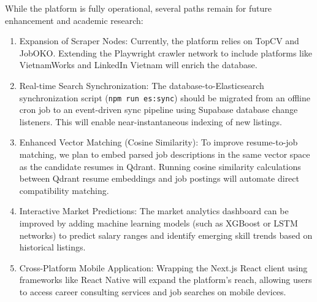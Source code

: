 \documentclass[12pt, a4paper]{report}
\begin{document}
\vspace{0.8cm}
\vspace{0.4cm}

While the platform is fully operational, several paths remain for future enhancement and academic research:

\begin{enumerate}
    \item Expansion of Scraper Nodes: Currently, the platform relies on TopCV and JobOKO. Extending the Playwright crawler network to include platforms like VietnamWorks and LinkedIn Vietnam will enrich the database.
    \item Real-time Search Synchronization: The database-to-Elasticsearch synchronization script (\texttt{npm run es:sync}) should be migrated from an offline cron job to an event-driven sync pipeline using Supabase database change listeners. This will enable near-instantaneous indexing of new listings.
    \item Enhanced Vector Matching (Cosine Similarity): To improve resume-to-job matching, we plan to embed parsed job descriptions in the same vector space as the candidate resumes in Qdrant. Running cosine similarity calculations between Qdrant resume embeddings and job postings will automate direct compatibility matching.
    \item Interactive Market Predictions: The market analytics dashboard can be improved by adding machine learning models (such as XGBoost or LSTM networks) to predict salary ranges and identify emerging skill trends based on historical listings.
    \item Cross-Platform Mobile Application: Wrapping the Next.js React client using frameworks like React Native will expand the platform's reach, allowing users to access career consulting services and job searches on mobile devices.
\end{enumerate}

\newpage

\hypertarget{sec:refs}{}
\par
\vspace{0.4cm}
\end{document}
